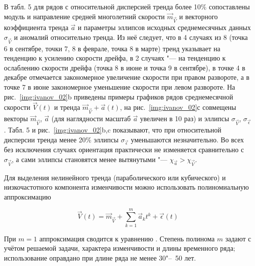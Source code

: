 В табл. 5 для рядов с относительной дисперсией тренда более 10$\%$ сопоставлены модуль и направление средней многолетний скорости $\vec{m}_{\vec{V}}$ и векторного коэффициента тренда $\vec{a}$ и параметры эллипсов исходных среднемесячных данных $\sigma_{\vec{V}}$ и аномалий относительно тренда. Из неё следует, что в 4 случаях из 8 (точка 6 в сентябре, точки 7, 8 в феврале, точка 8 в марте) тренд указывает на тенденцию к усилению скорости дрейфа, в 2 случаях "--- на тенденцию к ослаблению скорости дрейфа (точка 8 в июне и точка 9 в сентябре), в точке 4 в декабре отмечается закономерное увеличение скорости при правом развороте, а в точке 7 в июне закономерное уменьшение скорости при левом развороте. На рис.~\ref{img:ivanov_02}b приведены примеры графиков рядов среднемесячной скорости $\vec{V}(t)$ и тренда $\vec{m}_{\vec{V}}+{\vec{a}(t)}$, на рис.~\ref{img:ivanov_02}с совмещены векторы $\vec{m}_{\vec{V}}$, $\vec{a}$ (для наглядности масштаб $\vec{a}$ увеличен в 10 раз) и эллипсы  $\sigma_{\vec{V}}$,  $\sigma_{\vec{\epsilon}}$. Табл. 5 и рис.~\ref{img:ivanov_02}b,c показывают, что при относительной дисперсии тренда менее 20$\%$ эллипсы $\sigma_{\vec{\epsilon}}$ уменьшаются незначительно. Во всех без исключения случаях  ориентация практически не изменяется сравнительно с $\sigma_{\vec{V}}$,  а сами эллипсы становятся менее вытянутыми "--- $\chi_{\vec{a}}>\chi_{\vec{V}}$.  


Для выделения нелинейного тренда (параболического или кубического) и низкочастотного компонента изменчивости можно использовать полиномиальную аппроксимацию

\begin{equation}
\label{eq:equation3_17}
{\vec{V}(t)=\vec{m}_{\vec{V}}+{\sum_{k=1}^m\vec{a}_{k}t^k+\vec{\epsilon}(t)}}
\end{equation} 

При $m=1$ аппроксимация  сводится к уравнению . Степень полинома $m$ задают с учётом решаемой задачи, характера изменчивости и длины временного ряда; использование  оправдано при длине ряда не менее 30"--~50 лет.


